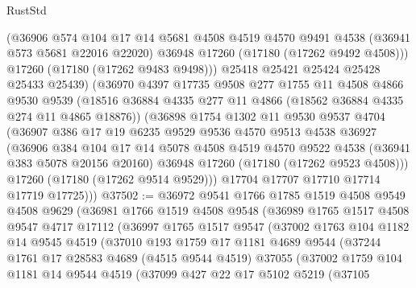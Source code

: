 \begin{lexlean}{RustStd}
\begin{coremodule}
{\begin{coremodule}
{{{{{{{{{{{{{{{{{{{{{{{{{{{{{{{{{{{{{{{{{{{{{{{{{{{{{{{          (@36906
            @574
            @104
            @17
            @14
            @5681
            @4508
            @4519
            @4570
            @9491
            @4538
            (@36941 @573 @5681 @22016 @22020)
            @36948
            @17260
            (@17180 (@17262 @9492 @4508)))
          @17260
          (@17180 (@17262 @9483 @9498)))
        @25418
        @25421
        @25424
        @25428
        @25433
        @25439)
      (@36970
        @4397
        @17735
        @9508
        @277
        @1755
        @11
        @4508
        @4866
        @9530
        @9539
        (@18516 @36884 @4335 @277 @11 @4866 (@18562 @36884 @4335 @274 @11 @4865 @18876))
        (@36898
          @1754
          @1302
          @11
          @9530
          @9537
          @4704
          (@36907
            @386
            @17
            @19
            @6235
            @9529
            @9536
            @4570
            @9513
            @4538
            @36927
            (@36906
              @384
              @104
              @17
              @14
              @5078
              @4508
              @4519
              @4570
              @9522
              @4538
              (@36941 @383 @5078 @20156 @20160)
              @36948
              @17260
              (@17180 (@17262 @9523 @4508)))
            @17260
            (@17180 (@17262 @9514 @9529)))
          @17704
          @17707
          @17710
          @17714
          @17719
          @17725)))
@37502 := @36972
    @9541
    @1766
    @1785
    @1519
    @4508
    @9549
    @4508
    @9629
    (@36981
      @1766
      @1519
      @4508
      @9548
      (@36989
        @1765
        @1517
        @4508
        @9547
        @4717
        @17112
        (@36997
          @1765
          @1517
          @9547
          (@37002
            @1763
            @104
            @1182
            @14
            @9545
            @4519
            (@37010
              @193
              @1759
              @17
              @1181
              @4689
              @9544
              (@37244
                @1761
                @17
                @28583
                @4689
                (@4515 @9544 @4519)
                @37055
                (@37002
                  @1759
                  @104
                  @1181
                  @14
                  @9544
                  @4519
                  (@37099
                    @427
                    @22
                    @17
                    @5102
                    @5219
                    (@37105
}}}}}}}}}}}}}}}}}}}}}}}}}}}}}}}}}}}}}}}}}}}}}}}}}}}}}}}
\end{coremodule}}
\end{coremodule}
\end{lexlean}
